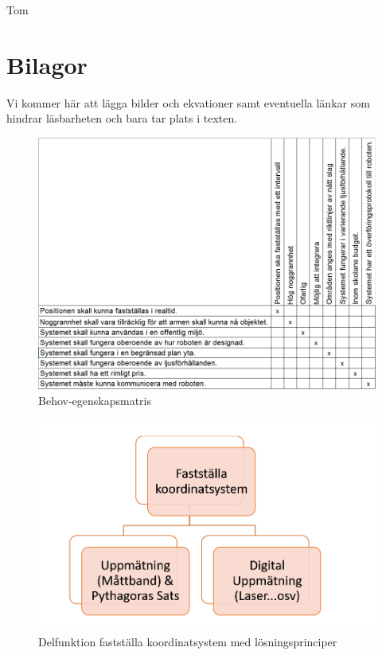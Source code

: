 \documentclass[11pt, a4paper]{report}
\begin{document}
\newpage
\begin{thebibliography}{99}

 Tom

\end{thebibliography}

\chapter{Bilagor}
Vi kommer här att lägga bilder och ekvationer samt eventuella länkar som hindrar läsbarheten och bara tar plats i texten.

\begin{figure}[H]
	\begin{center}
		\includegraphics [width=12cm,angle=0]{behov-egenskap-matris.png}
		\caption{Behov-egenskapsmatris}
		\label{fig:behov-egenskap}
	\end{center}
\end{figure}


\begin{figure}[H]
	\begin{center}
		\includegraphics [width=12cm, height=7cm, angle=0]{faststallakoordinatsystem.png}
		\caption{Delfunktion fastställa koordinatsystem med lösningsprinciper}
		\label{fig:koordinatsystem}
	\end{center}
\end{figure}
\end{document}

